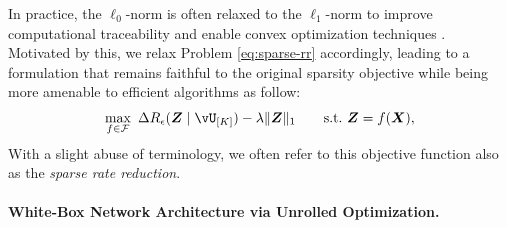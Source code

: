 \documentclass[\toplevelprefix/book-main.tex]{subfiles}
\begin{document}

In practice, the $\ell_0$-norm is often relaxed to the $\ell_1$-norm to improve computational traceability and enable convex optimization techniques \cite{Wright-Ma-2022}. Motivated by this, we relax Problem \eqref{eq:sparse-rr} accordingly, leading to a formulation that remains faithful to the original sparsity objective while being more amenable to efficient algorithms as follow:  
\begin{equation}
\begin{aligned}
   \max_{f \in \mathcal{F}}\    \Delta R_{\epsilon}(\Z \mid \vU_{[K]}) - \lambda \|\bm{Z}\|_1  \qquad \text{s.t.}\ \Z = f(\X),
   \label{eq:sparse-rr-1}
\end{aligned}
\end{equation}
 With a slight abuse of terminology, we often refer to this objective function also as the \textit{sparse rate reduction}. 

\paragraph{White-Box Network Architecture via Unrolled Optimization.} 

\end{document}
